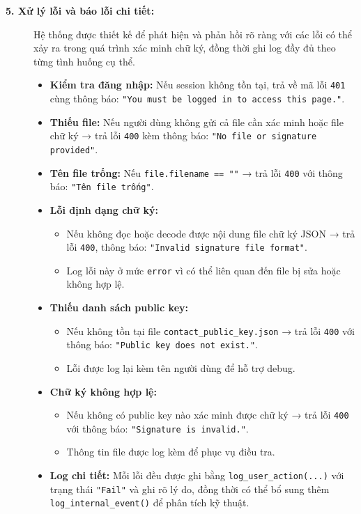 \begin{description}
    \item[\textbf{5. Xử lý lỗi và báo lỗi chi tiết:}]
    Hệ thống được thiết kế để phát hiện và phản hồi rõ ràng với các lỗi có thể xảy ra trong quá trình xác minh chữ ký, đồng thời ghi log đầy đủ theo từng tình huống cụ thể.
    \begin{itemize}
        \item \textbf{Kiểm tra đăng nhập:} Nếu session không tồn tại, trả về mã lỗi \texttt{401} cùng thông báo: \texttt{"You must be logged in to access this page."}.
        \item \textbf{Thiếu file:} Nếu người dùng không gửi cả file cần xác minh hoặc file chữ ký → trả lỗi \texttt{400} kèm thông báo: \texttt{"No file or signature provided"}.
        \item \textbf{Tên file trống:} Nếu \texttt{file.filename == ""} → trả lỗi \texttt{400} với thông báo: \texttt{"Tên file trống"}.
        \item \textbf{Lỗi định dạng chữ ký:}
        \begin{itemize}
            \item Nếu không đọc hoặc decode được nội dung file chữ ký JSON → trả lỗi \texttt{400}, thông báo: \texttt{"Invalid signature file format"}.
            \item Log lỗi này ở mức \texttt{error} vì có thể liên quan đến file bị sửa hoặc không hợp lệ.
        \end{itemize}
        \item \textbf{Thiếu danh sách public key:}
        \begin{itemize}
            \item Nếu không tồn tại file \texttt{contact\_public\_key.json} → trả lỗi \texttt{400} với thông báo: \texttt{"Public key does not exist."}.
            \item Lỗi được log lại kèm tên người dùng để hỗ trợ debug.
        \end{itemize}
        \item \textbf{Chữ ký không hợp lệ:}
        \begin{itemize}
            \item Nếu không có public key nào xác minh được chữ ký → trả lỗi \texttt{400} với thông báo: \texttt{"Signature is invalid."}.
            \item Thông tin file được log kèm để phục vụ điều tra.
        \end{itemize}
        \item \textbf{Log chi tiết:} Mỗi lỗi đều được ghi bằng \texttt{log\_user\_action(...)} với trạng thái \texttt{"Fail"} và ghi rõ lý do, đồng thời có thể bổ sung thêm \texttt{log\_internal\_event()} để phân tích kỹ thuật.
    \end{itemize}


\end{description}
